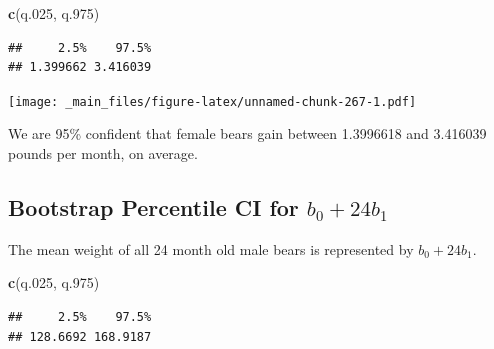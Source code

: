 \documentclass[]{book}
\newenvironment{Shaded}{\begin{snugshade}}{\end{snugshade}}
\newcommand{\KeywordTok}[1]{\textcolor[rgb]{0.13,0.29,0.53}{\textbf{#1}}}
\newcommand{\DecValTok}[1]{\textcolor[rgb]{0.00,0.00,0.81}{#1}}
\newcommand{\FloatTok}[1]{\textcolor[rgb]{0.00,0.00,0.81}{#1}}
\newcommand{\StringTok}[1]{\textcolor[rgb]{0.31,0.60,0.02}{#1}}
\newcommand{\OperatorTok}[1]{\textcolor[rgb]{0.81,0.36,0.00}{\textbf{#1}}}
\newcommand{\NormalTok}[1]{#1}
\begin{document}
\begin{Shaded}
\begin{Highlighting}[]
\KeywordTok{c}\NormalTok{(q.}\DecValTok{025}\NormalTok{, q.}\DecValTok{975}\NormalTok{)}
\end{Highlighting}
\end{Shaded}

\begin{verbatim}
##     2.5%    97.5% 
## 1.399662 3.416039
\end{verbatim}

\texttt{[image: \_main\_files/figure-latex/unnamed-chunk-267-1.pdf]}

We are 95\% confident that female bears gain between 1.3996618 and
3.416039 pounds per month, on average.

\subsection{\texorpdfstring{Bootstrap Percentile CI for
\(b_0 + 24b_1\)}{Bootstrap Percentile CI for b\_0 + 24b\_1}}\label{bootstrap-percentile-ci-for-b_0-24b_1}

The mean weight of all 24 month old male bears is represented by
\(b_0 + 24b_1\).

\begin{Shaded}
\end{Shaded}

\begin{Shaded}
\begin{Highlighting}[]
\KeywordTok{c}\NormalTok{(q.}\DecValTok{025}\NormalTok{, q.}\DecValTok{975}\NormalTok{)}
\end{Highlighting}
\end{Shaded}

\begin{verbatim}
##     2.5%    97.5% 
## 128.6692 168.9187
\end{verbatim}
\end{document}
